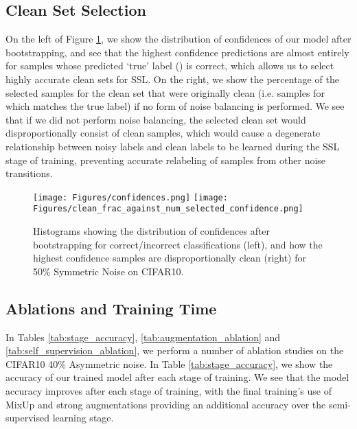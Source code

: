 \documentclass[10pt,twocolumn,letterpaper]{article}
\begin{document}
\subsection{Clean Set Selection}

On the left of Figure \ref{fig:cleanandcorrectbias}, we show the distribution of confidences of our model after bootstrapping, and see that the highest confidence predictions are almost entirely for samples whose predicted `true' label () is correct, which allows us to select highly accurate clean sets for SSL. On the right, we show the percentage of the selected samples for the clean set that were originally clean (i.e. samples for which  matches the true label) if no form of noise balancing is performed. We see that if we did not perform noise balancing, the selected clean set would disproportionally consist of clean samples, which would cause a degenerate relationship between noisy labels and clean labels to be learned during the SSL stage of training, preventing accurate relabeling of samples from other noise transitions. 

\begin{figure}[ht!]
    \begin{center}
    \texttt{[image: Figures/confidences.png]}\hfill
    \texttt{[image: Figures/clean\_frac\_against\_num\_selected\_confidence.png]}
    \end{center}
    \caption{Histograms showing the distribution of confidences after bootstrapping for correct/incorrect classifications (left), and how the highest confidence samples are disproportionally clean (right) for 50\% Symmetric Noise on CIFAR10.}
    \label{fig:cleanandcorrectbias}
\end{figure}

\subsection{Ablations and Training Time}

In Tables \ref{tab:stage_accuracy}, \ref{tab:augmentation_ablation} and \ref{tab:self_supervision_ablation}, we perform a number of ablation studies on the CIFAR10 40\% Asymmetric noise. 
In Table \ref{tab:stage_accuracy}, we show the accuracy of our trained model after each stage of training. We see that the model accuracy improves after each stage of training, with the final training's use of MixUp and strong augmentations providing an additional  accuracy over the semi-supervised learning stage.
\end{document}
